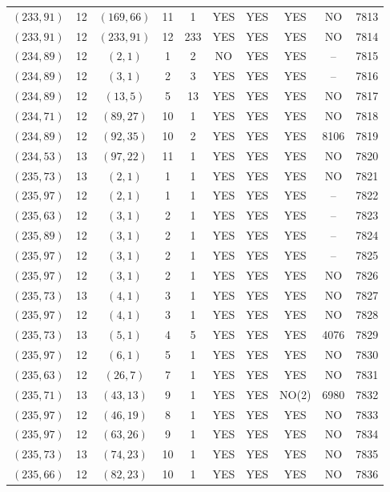 \begin{longtable}{|c|c|c|c|c|c|c|c|c|c|}
$(233, 91)$ & 12 & $(169, 66)$ & 11 & 1 & YES & YES & YES & NO & 7813\\
$(233, 91)$ & 12 & $(233, 91)$ & 12 & 233 & YES & YES & YES & NO & 7814\\
$(234, 89)$ & 12 & $(2, 1)$ & 1 & 2 & NO & YES & YES & -- & 7815\\
$(234, 89)$ & 12 & $(3, 1)$ & 2 & 3 & YES & YES & YES & -- & 7816\\
$(234, 89)$ & 12 & $(13, 5)$ & 5 & 13 & YES & YES & YES & NO & 7817\\
$(234, 71)$ & 12 & $(89, 27)$ & 10 & 1 & YES & YES & YES & NO & 7818\\
$(234, 89)$ & 12 & $(92, 35)$ & 10 & 2 & YES & YES & YES & 8106 & 7819\\
$(234, 53)$ & 13 & $(97, 22)$ & 11 & 1 & YES & YES & YES & NO & 7820\\
$(235, 73)$ & 13 & $(2, 1)$ & 1 & 1 & YES & YES & YES & NO & 7821\\
$(235, 97)$ & 12 & $(2, 1)$ & 1 & 1 & YES & YES & YES & -- & 7822\\
$(235, 63)$ & 12 & $(3, 1)$ & 2 & 1 & YES & YES & YES & -- & 7823\\
$(235, 89)$ & 12 & $(3, 1)$ & 2 & 1 & YES & YES & YES & -- & 7824\\
$(235, 97)$ & 12 & $(3, 1)$ & 2 & 1 & YES & YES & YES & -- & 7825\\
$(235, 97)$ & 12 & $(3, 1)$ & 2 & 1 & YES & YES & YES & NO & 7826\\
$(235, 73)$ & 13 & $(4, 1)$ & 3 & 1 & YES & YES & YES & NO & 7827\\
$(235, 97)$ & 12 & $(4, 1)$ & 3 & 1 & YES & YES & YES & NO & 7828\\
$(235, 73)$ & 13 & $(5, 1)$ & 4 & 5 & YES & YES & YES & 4076 & 7829\\
$(235, 97)$ & 12 & $(6, 1)$ & 5 & 1 & YES & YES & YES & NO & 7830\\
$(235, 63)$ & 12 & $(26, 7)$ & 7 & 1 & YES & YES & YES & NO & 7831\\
$(235, 71)$ & 13 & $(43, 13)$ & 9 & 1 & YES & YES & NO(2) & 6980 & 7832\\
$(235, 97)$ & 12 & $(46, 19)$ & 8 & 1 & YES & YES & YES & NO & 7833\\
$(235, 97)$ & 12 & $(63, 26)$ & 9 & 1 & YES & YES & YES & NO & 7834\\
$(235, 73)$ & 13 & $(74, 23)$ & 10 & 1 & YES & YES & YES & NO & 7835\\
$(235, 66)$ & 12 & $(82, 23)$ & 10 & 1 & YES & YES & YES & NO & 7836\\

\end{longtable}
